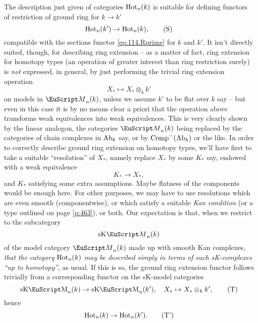 The description just given of categories $\operatorname{Hot}_n(k)$ is suitable for
defining functors of restriction of ground ring for $k\to k'$
\begin{equation}
  \label{eq:114.S}
  \operatorname{Hot}_n(k')\to\operatorname{Hot}_n(k),\tag{S}
\end{equation}
compatible with the sections functor \eqref{eq:114.Rprime} for $k$ and
$k'$. It isn't directly suited, though, for describing ring extension
-- as a matter of fact, ring extension for homotopy types
(an operation of greater interest than ring restriction surely) is
\emph{not} expressed, in general, by just performing the trivial ring
extension operation
\[X_*\mapsto X_*\otimes_k k'\]
on models in $\scrM_n(k)$, unless we assume $k'$ to be flat over $k$
say -- but even in this case it is by no means clear a priori that the
operation above transforms weak equivalences into weak
equivalences. This is very clearly shown by the linear analogon, the
categories $\scrM_n(k)$ being replaced by the categories of chain
complexes in $\operatorname{Ab}_k$ say, or by $\operatorname{Comp}^-(\operatorname{Ab}_k)$ or the like. In
order to correctly describe ground ring extension on homotopy types,
we'll have first to take a suitable ``resolution'' of $X_*$, namely
replace $X_*$ by some $K_*$ say, endowed with a weak equivalence
\[K_*\to X_*,\]
and $K_*$ satisfying some extra assumptions. Maybe flatness of the
components would be enough here. For other purposes, we may have to
use resolutions which are even smooth (componentwise), or which
satisfy a suitable \emph{Kan condition} (or a type outlined on page
\ref{p:463}), or both. Our expectation is that, when we restrict to
the subcategory
\[\mathrm{sK}\scrM_n(k)\]
of the model category $\scrM_n(k)$ made up with smooth Kan complexes,
\emph{that the category $\operatorname{Hot}_n(k)$ may be described simply in terms
  of such sK-complexes ``up to homotopy''}, as usual. If this is so,
the ground ring extension functor follows trivially from a
corresponding functor on the sK-model categories
\begin{equation}
  \label{eq:114.T}
  \sKM_n(k)\to\sKM_n(k'), \quad X_*\mapsto X_*\otimes_k k',\tag{T}
\end{equation}
hence
\begin{equation}
  \label{eq:114.Tprime}
  \operatorname{Hot}_n(k)\to\operatorname{Hot}_n(k').\tag{T'}
\end{equation}

